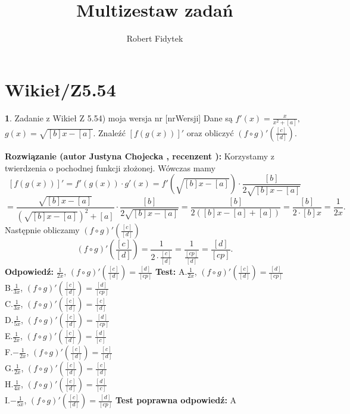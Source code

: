 \documentclass[12pt, a4paper]{article}
\title{Multizestaw zadań}
\author{Robert Fidytek}
\date{}
\theoremstyle{definition} %
\newtheorem{zad}{}
\newcommand{\kategoria}[1]{\section{#1}} %
\newcommand{\zadStart}[1]{\begin{zad}#1\newline} %
\newcommand{\zadStop}{\end{zad}}   %
\newcommand{\rozwStart}[2]{\noindent \textbf{Rozwiązanie (autor #1 , recenzent #2): }\newline} %
\newcommand{\rozwStop}{\newline}                                            %
\newcommand{\odpStart}{\noindent \textbf{Odpowiedź:}\newline}    %
\newcommand{\odpStop}{\newline}                                             %
\newcommand{\testStart}{\noindent \textbf{Test:}\newline} %
\newcommand{\testStop}{\newline} %
\newcommand{\kluczStart}{\noindent \textbf{Test poprawna odpowiedź:}\newline} %
\newcommand{\kluczStop}{\newline} %
\begin{document}
\maketitle


\kategoria{Wikieł/Z5.54}
\zadStart{Zadanie z Wikieł Z 5.54) moja wersja nr [nrWersji]}
Dane są $f'(x)=\frac{x}{x^{2}+[a]},$ $g(x)=\sqrt{[b]x-[a]}$. Znaleźć $[f(g(x))]'$ oraz obliczyć $(f\circ g)'\left(\frac{[c]}{[d]}\right).$
\zadStop
\rozwStart{Justyna Chojecka}{}
Korzystamy z twierdzenia o pochodnej funkcji złożonej. Wówczas mamy
$$[f(g(x))]'=f'(g(x))\cdot g'(x)=f'\left(\sqrt{[b]x-[a]}\right)\cdot \frac{[b]}{2\sqrt{[b]x-[a]}}$$$$=\frac{\sqrt{[b]x-[a]}}{(\sqrt{[b]x-[a]})^{2}+[a]}\cdot \frac{[b]}{2\sqrt{[b]x-[a]}}=\frac{[b]}{2([b]x-[a]+[a])}=\frac{[b]}{2\cdot [b]x}=\frac{1}{2x}.$$
Następnie obliczamy $(f\circ g)'\left(\frac{[c]}{[d]}\right)$
$$(f\circ g)'\left(\frac{[c]}{[d]}\right)=\frac{1}{2\cdot\frac{[c]}{[d]}}=\frac{1}{\frac{[cp]}{[d]}}=\frac{[d]}{[cp]}.$$
\rozwStop
\odpStart
$\frac{1}{2x}$, $(f\circ g)'\left(\frac{[c]}{[d]}\right)=\frac{[d]}{[cp]}$
\odpStop
\testStart
A.$\frac{1}{2x}$, $(f\circ g)'\left(\frac{[c]}{[d]}\right)=\frac{[d]}{[cp]}$\\
B.$\frac{1}{3x}$, $(f\circ g)'\left(\frac{[c]}{[d]}\right)=\frac{[d]}{[cp]}$\\
C.$\frac{1}{3x}$, $(f\circ g)'\left(\frac{[c]}{[d]}\right)=\frac{[c]}{[d]}$\\
D.$\frac{1}{5x}$, $(f\circ g)'\left(\frac{[c]}{[d]}\right)=\frac{[d]}{[cp]}$\\
E.$\frac{1}{2x}$, $(f\circ g)'\left(\frac{[c]}{[d]}\right)=\frac{[d]}{[c]}$\\
F.$-\frac{1}{2x}$, $(f\circ g)'\left(\frac{[c]}{[d]}\right)=\frac{[c]}{[d]}$\\
G.$\frac{1}{2x}$, $(f\circ g)'\left(\frac{[c]}{[d]}\right)=\frac{[c]}{[d]}$\\
H.$\frac{1}{4x}$, $(f\circ g)'\left(\frac{[c]}{[d]}\right)=\frac{[d]}{[c]}$\\
I.$-\frac{1}{5x}$, $(f\circ g)'\left(\frac{[c]}{[d]}\right)=\frac{[d]}{[cp]}$
\testStop
\kluczStart
A
\kluczStop
\end{document}
